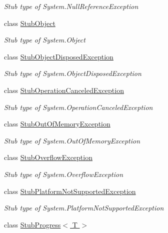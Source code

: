 \begin{DoxyCompactItemize}
\begin{DoxyCompactList}\small\item\em Stub type of System.\-Null\-Reference\-Exception\end{DoxyCompactList}\item 
class \hyperlink{class_system_1_1_fakes_1_1_stub_object}{Stub\-Object}
\begin{DoxyCompactList}\small\item\em Stub type of System.\-Object\end{DoxyCompactList}\item 
class \hyperlink{class_system_1_1_fakes_1_1_stub_object_disposed_exception}{Stub\-Object\-Disposed\-Exception}
\begin{DoxyCompactList}\small\item\em Stub type of System.\-Object\-Disposed\-Exception\end{DoxyCompactList}\item 
class \hyperlink{class_system_1_1_fakes_1_1_stub_operation_canceled_exception}{Stub\-Operation\-Canceled\-Exception}
\begin{DoxyCompactList}\small\item\em Stub type of System.\-Operation\-Canceled\-Exception\end{DoxyCompactList}\item 
class \hyperlink{class_system_1_1_fakes_1_1_stub_out_of_memory_exception}{Stub\-Out\-Of\-Memory\-Exception}
\begin{DoxyCompactList}\small\item\em Stub type of System.\-Out\-Of\-Memory\-Exception\end{DoxyCompactList}\item 
class \hyperlink{class_system_1_1_fakes_1_1_stub_overflow_exception}{Stub\-Overflow\-Exception}
\begin{DoxyCompactList}\small\item\em Stub type of System.\-Overflow\-Exception\end{DoxyCompactList}\item 
class \hyperlink{class_system_1_1_fakes_1_1_stub_platform_not_supported_exception}{Stub\-Platform\-Not\-Supported\-Exception}
\begin{DoxyCompactList}\small\item\em Stub type of System.\-Platform\-Not\-Supported\-Exception\end{DoxyCompactList}\item 
class \hyperlink{class_system_1_1_fakes_1_1_stub_progress_3_01_t_01_4}{Stub\-Progress$<$ T $>$}

\end{DoxyCompactItemize}
